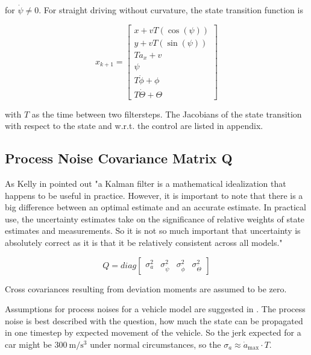 \documentclass[conference]{IEEEtran}
\begin{document}
for $\dot \psi \neq 0$. For straight driving without curvature, the state transition function is

\begin{equation}
x_{k+1}=\left[\begin{matrix}x + vT \left(\cos(\psi)\right)\\y + vT \left(\sin (\psi) \right) \\ T a_{x} + v\\\psi \\T \dot\phi + \phi\\T \dot\Theta + \Theta\end{matrix}\right]
\end{equation}

with $T$ as the time between two filtersteps. The Jacobians of the state transition with respect to the state and w.r.t. the control are listed in appendix.

\subsection{Process Noise Covariance Matrix Q}

As Kelly in \cite{Kelly1994} pointed out "a Kalman filter is a mathematical idealization that happens to be useful in practice. However, it is important to note that there is a big difference between an optimal estimate and an accurate estimate. In practical use, the uncertainty estimates take on the significance of relative weights of state estimates and measurements. So it is not so much important that uncertainty is absolutely correct as it is that it be relatively consistent across all models."

\begin{equation}Q=diag\label{Q}\left[\begin{matrix}\sigma_{a}^2 & \sigma_{{\dot\psi}}^2 & \sigma_{{\dot\phi}}^2 & \sigma_{{\dot\Theta}}^2 \end{matrix}\right]\end{equation}

Cross covariances resulting from deviation moments are assumed to be zero.

Assumptions for process noises for a vehicle model are suggested in \cite{Kelly1994}. The process noise is best described with the question, how much the state can be propagated in one timestep by expected movement of the vehicle. So the jerk expected for a car might be $\SI{300}{\metre\per\cubic\second}$ under normal circumstances, so the $\sigma_a \approx \dot a_\text{max}\cdot T$.
\end{document}
